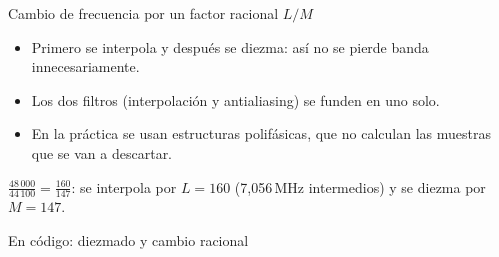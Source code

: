 \documentclass[aspectratio=169,11pt]{beamer}
\begin{document}
\begin{frame}{Cambio de frecuencia por un factor racional $L/M$}
  \begin{center}
  \end{center}
  \begin{itemize}
    \item Primero se interpola y después se diezma: así no se pierde banda innecesariamente.
    \item Los dos filtros (interpolación y antialiasing) se funden en uno solo.
    \item En la práctica se usan estructuras \alert{polifásicas}, que no calculan las muestras que se van a descartar.
  \end{itemize}
  \begin{ejemplo}
    $\frac{48\,000}{44\,100}=\frac{160}{147}$: se interpola por $L=160$ (7,056\,MHz intermedios) y se diezma por $M=147$.
  \end{ejemplo}
\end{frame}

\begin{frame}{En código: diezmado y cambio racional}
\end{frame}
\end{document}
